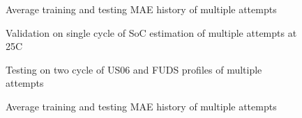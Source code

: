 \begin{figure*}[htbp]
    \centering
    \begin{subfigure}[b]{0.325\textwidth}
        \centering
        
        \caption{Average training and testing MAE history of multiple attempts}
    \end{subfigure}
    \hfill
    \begin{subfigure}[b]{0.325\textwidth}
        \centering
        
        \caption{Validation on single cycle of SoC estimation of multiple attempts at 25\textdegree{}C}
    \end{subfigure}
    \hfill
    \begin{subfigure}[b]{0.325\textwidth}
        \centering
        
        \caption{Testing on two cycle of US06 and FUDS profiles of multiple attempts}
        \label{subfig:Model-5res-DSTvsFUDS}
    \end{subfigure}
    \begin{subfigure}[b]{0.325\textwidth}
        \centering
        
        \caption{Average training and testing MAE history of multiple attempts}

\end{subfigure}
\end{figure*}
